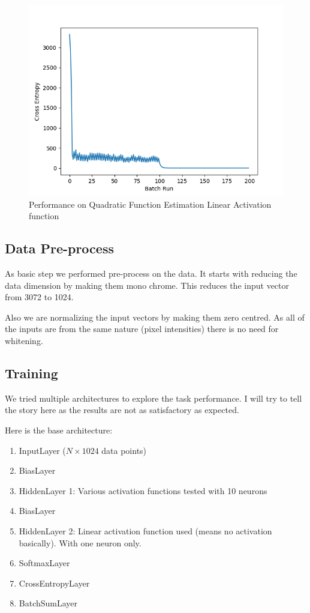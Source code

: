\begin{figure}[!htb]
    \centering
    \includegraphics[scale=0.7]{images/quadratic_performance_linear.png}
    \caption{Performance on Quadratic Function Estimation Linear Activation function}
\end{figure}

\subsection{Data Pre-process}
As basic step we performed pre-process on the data. It starts with  reducing the data dimension by making them mono chrome. This reduces the input vector from 3072 to 1024.  

Also we are normalizing the input vectors by making them zero centred. As all of the inputs are from the same nature (pixel intensities) there is no need for whitening.

\subsection{Training }
We tried multiple architectures to explore the  task performance.  I will try to tell the story here as the results are not as satisfactory as expected.

Here is the base architecture: 
\begin{enumerate}
    \item InputLayer ($N \times 1024 $ data points)
    \item BiasLayer 
    \item HiddenLayer 1: Various activation functions tested with 10 neurons     
    \item BiasLayer 
    \item HiddenLayer 2: Linear activation function used (means no activation basically). With one neuron only. 
    \item SoftmaxLayer
    \item CrossEntropyLayer
    \item BatchSumLayer 
\end{enumerate}

